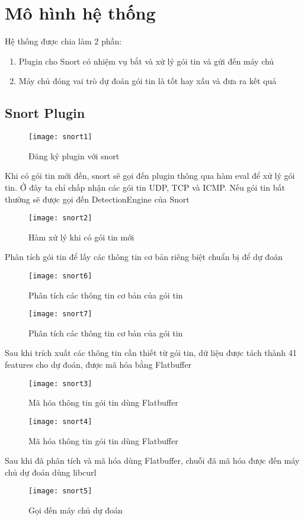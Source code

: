 \section{Mô hình hệ thống}
Hệ thống được chia làm 2 phần:
\begin{enumerate}
	\item Plugin cho Snort có nhiệm vụ bắt và xử lý gói tin và gửi đến máy chủ
	\item Máy chủ đóng vai trò dự đoán gói tin là tốt hay xấu và đưa ra kết quả
\end{enumerate}
\subsection{Snort Plugin}
\begin{figure}[!htbp]
    \centering
    \texttt{[image: snort1]}
    \caption{Đăng ký plugin với snort}
    \label{fig:x cubed graph}
\end{figure}
\FloatBarrier
Khi có gói tin mới đến, snort sẽ gọi đến plugin thông qua hàm eval để xử lý gói tin.
Ở đây ta chỉ chấp nhận các gói tin UDP, TCP và ICMP.
Nếu gói tin bất thường sẽ được gọi đến DetectionEngine của Snort
\begin{figure}[!htbp]
    \centering
    \texttt{[image: snort2]}
    \caption{Hàm xử lý khi có gói tin mới}
    \label{fig:x cubed graph}
\end{figure}
\FloatBarrier
Phân tích gói tin để lấy các thông tin cơ bản riêng biệt chuẩn bị để dự đoán
\begin{figure}[!htbp]
    \centering
    \texttt{[image: snort6]}
    \caption{Phân tích các thông tin cơ bản của gói tin}
    \label{fig:x cubed graph}
\end{figure}
\FloatBarrier
\begin{figure}[!htbp]
    \centering
    \texttt{[image: snort7]}
    \caption{Phân tích các thông tin cơ bản của gói tin}
    \label{fig:x cubed graph}
\end{figure}
\FloatBarrier
Sau khi trích xuất các thông tin cần thiết từ gói tin, dữ liệu được tách thành 41 features cho dự đoán, 
được mã hóa bằng Flatbuffer
\begin{figure}[!htbp]
    \centering
    \texttt{[image: snort3]}
    \caption{Mã hóa thông tin gói tin dùng Flatbuffer}
    \label{fig:x cubed graph}
\end{figure}
\FloatBarrier
\begin{figure}[!htbp]
    \centering
    \texttt{[image: snort4]}
    \caption{Mã hóa thông tin gói tin dùng Flatbuffer}
    \label{fig:x cubed graph}
\end{figure}
\FloatBarrier
Sau khi đã phân tích và mã hóa dùng Flatbuffer, chuỗi đã mã hóa được đến máy chủ dự đoán dùng libcurl
\begin{figure}[!htbp]
    \centering
    \texttt{[image: snort5]}
    \caption{Gọi đến máy chủ dự đoán}
    \label{fig:x cubed graph}
\end{figure}
\FloatBarrier
